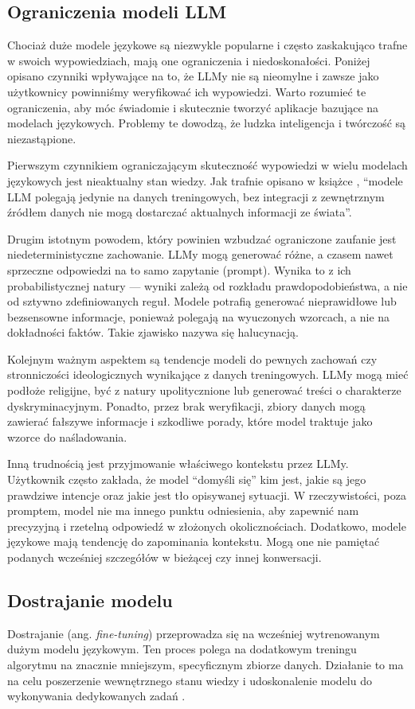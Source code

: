         \subsection{Ograniczenia modeli LLM}
        Chociaż duże modele językowe są niezwykle popularne i często zaskakująco trafne w swoich wypowiedziach, mają one ograniczenia i niedoskonałości. Poniżej opisano czynniki wpływające na to, że LLMy nie są nieomylne i zawsze jako użytkownicy powinniśmy weryfikować ich wypowiedzi. Warto rozumieć te ograniczenia, aby móc świadomie i skutecznie tworzyć aplikacje bazujące na modelach językowych. Problemy te dowodzą, że ludzka inteligencja i twórczość są niezastąpione.

        Pierwszym czynnikiem ograniczającym skuteczność wypowiedzi w wielu modelach językowych jest nieaktualny stan wiedzy. Jak trafnie opisano w książce \cite{genAI_langchain2024}, \enquote{modele LLM polegają jedynie na danych treningowych, bez integracji z zewnętrznym źródłem danych nie mogą dostarczać aktualnych informacji ze świata}.

        Drugim istotnym powodem, który powinien wzbudzać ograniczone zaufanie jest niedeterministyczne zachowanie. LLMy mogą generować różne, a czasem nawet sprzeczne odpowiedzi na to samo zapytanie (prompt). Wynika to z ich probabilistycznej natury — wyniki zależą od rozkładu prawdopodobieństwa, a nie od sztywno zdefiniowanych reguł. Modele potrafią generować nieprawidłowe lub bezsensowne informacje, ponieważ polegają na wyuczonych wzorcach, a nie na dokładności faktów. Takie zjawisko nazywa się halucynacją.
        
        Kolejnym ważnym aspektem są tendencje modeli do pewnych zachowań czy stronniczości ideologicznych wynikające z danych treningowych. LLMy mogą mieć podłoże religijne, być z natury upolitycznione lub generować treści o charakterze dyskryminacyjnym. Ponadto, przez brak weryfikacji, zbiory danych mogą zawierać fałszywe informacje i szkodliwe porady, które model traktuje jako wzorce do naśladowania.
        
        Inną trudnością jest przyjmowanie właściwego kontekstu przez LLMy. Użytkownik często zakłada, że model \enquote{domyśli się} kim jest, jakie są jego prawdziwe intencje oraz jakie jest tło opisywanej sytuacji. W rzeczywistości, poza promptem, model nie ma innego punktu odniesienia, aby zapewnić nam precyzyjną i rzetelną odpowiedź w złożonych okolicznościach. Dodatkowo, modele językowe mają tendencję do zapominania kontekstu. Mogą one nie pamiętać podanych wcześniej szczegółów w bieżącej czy innej konwersacji.


        \subsection{Dostrajanie modelu}
        Dostrajanie (ang. \textit{fine-tuning}) przeprowadza się na wcześniej wytrenowanym dużym modelu językowym. Ten proces polega na dodatkowym treningu algorytmu na znacznie mniejszym, specyficznym zbiorze danych. Działanie to ma na celu poszerzenie wewnętrznego stanu wiedzy i udoskonalenie modelu do wykonywania dedykowanych zadań \cite{fine_tuning2024}.